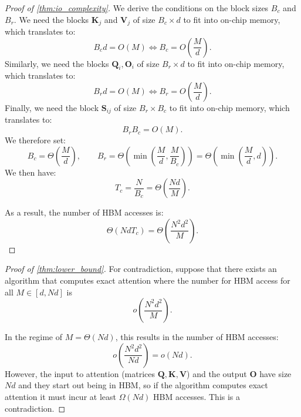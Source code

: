 \documentclass{article}
\newcommand{\vQ}{\mathbf{Q}}
\newcommand{\vK}{\mathbf{K}}
\newcommand{\vV}{\mathbf{V}}
\newcommand{\vS}{\mathbf{S}}
\newcommand{\vO}{\mathbf{O}}
\begin{document}
\begin{proof}[Proof of \cref{thm:io_complexity}]
  We derive the conditions on the block sizes $B_c$ and $B_r$.
  We need the blocks $\vK_j$ and $\vV_j$ of size $B_c \times d$ to fit into
  on-chip memory, which translates to:
  \begin{equation*}
    B_c d = O(M) \Leftrightarrow B_c = O \left( \frac{M}{d} \right).
  \end{equation*}
  Similarly, we need the blocks $\vQ_i, \vO_i$ of size $B_r \times d$ to fit
  into on-chip memory, which translates to:
  \begin{equation*}
    B_r d = O(M) \Leftrightarrow B_r = O \left( \frac{M}{d} \right).
  \end{equation*}
  Finally, we need the block $\vS_{ij}$ of size $B_r \times  B_c$ to
  fit into on-chip memory, which translates to:
  \begin{equation*}
    B_r B_c = O(M).
  \end{equation*}
  We therefore set:
  \begin{equation*}
    B_c = \Theta \left( \frac{M}{d} \right), \qquad
    B_r = \Theta \left( \min \left( \frac{M}{d}, \frac{M}{B_c} \right) \right) = \Theta \left( \min \left( \frac{M}{d}, d \right) \right).
  \end{equation*}
  We then have:
  \begin{equation*}
    T_c = \frac{N}{B_c} = \Theta \left( \frac{Nd}{M} \right).
  \end{equation*}

  As a result, the number of HBM accesses is:
  \begin{equation*}
    \Theta \left( Nd T_c \right) = \Theta \left( \frac{N^2 d^2}{M} \right).
  \end{equation*}

\end{proof}

\begin{proof}[Proof of \cref{thm:lower_bound}]
  For contradiction, suppose that there exists an algorithm that computes
  exact attention where the number for HBM access for all $M \in [d, Nd]$ is
  \begin{equation*}
    o \left( \frac{N^2d^2}{M} \right).
  \end{equation*}

  In the regime of $M = \Theta(Nd)$, this results in the number of HBM accesses:
  \begin{equation*}
    o \left( \frac{N^2 d^2}{Nd} \right) = o(Nd).
  \end{equation*}
  However, the input to attention (matrices $\vQ, \vK, \vV$) and the output $\vO$ have
  size $Nd$ and they start out being in HBM, so if the algorithm computes exact
  attention it must incur at least $\Omega(Nd)$ HBM accesses.
  This is a contradiction.
\end{proof}
\end{document}
